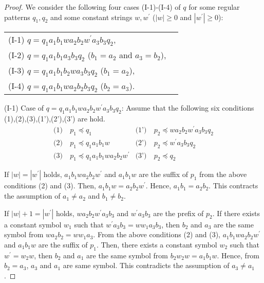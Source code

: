 \begin{proof}

\noindent
We consider the following four cases (I-1)-(I-4) of $q$ for some regular patterns $q_{1},q_{2}$ and some constant strings $w,w^{\prime}$ ($|w|\geq 0$ and $|w^{\prime}|\geq 0$):

\smallskip
\noindent
\begin{tabular}{ll}
(I-1) $q=q_{1}a_{1}b_{1}wa_{2}b_{2}w^{\prime}a_{3}b_{3}q_{2}$,\\
(I-2) $q=q_{1}a_{1}b_{1}a_{3}b_{3}q_{2}$ ($b_{1}=a_{2}$ and $a_{3}=b_{2}$),\\
(I-3) $q=q_{1}a_{1}b_{1}b_{2}wa_{3}b_{3}q_{2}$ ($b_{1}=a_{2}$),\\
(I-4) $q=q_{1}a_{1}b_{1}wa_{2}b_{2}b_{3}q_{2}$ ($b_{2}=a_{3}$).
\end{tabular}
\smallskip

\noindent
(I-1) Case of $q=q_{1}a_{1}b_{1}wa_{2}b_{2}w^{\prime}a_{3}b_{3}q_{2}$:
Assume that the following six conditions (1),(2),(3),(1'),(2'),(3') are hold.
\begin{align*}
\textrm{(1)}~& p_{1} \preceq q_{1} & \textrm{(1')}~& p_{2} \preceq wa_{2}b_{2}w^{\prime}a_{3}b_{3}q_{2} \\
\textrm{(2)}~& p_{1} \preceq q_{1}a_{1}b_{1}w & \textrm{(2')}~& p_{2} \preceq w^{\prime}a_{3}b_{3}q_{2} \\
\textrm{(3)}~& p_{1} \preceq q_{1}a_{1}b_{1}wa_{2}b_{2}w^{\prime} & \textrm{(3')}~& p_{2} \preceq q_{2}
\end{align*}

If $|w|=|w^{\prime}|$ holds, $a_{1}b_{1}wa_{2}b_{2}w^{\prime}$ and $a_{1}b_{1}w$ are the suffix of $p_{1}$ from the above conditions (2) and (3).
Then, $a_{1}b_{1}w=a_{2}b_{2}w^{\prime}$.
Hence, $a_{1}b_{1}=a_{2}b_{2}$.
This contracts the assumption of $a_{1} \ne a_{2}$ and $b_{1} \ne b_{2}$.

If $|w|+1=|w^{\prime}|$ holds, $wa_{2}b_{2}w^{\prime}a_{3}b_{3}$ and $w^{\prime}a_{3}b_{3}$ are the prefix of $p_{2}$.
If there exists a constant symbol $w_{1}$ such that $w^{\prime}a_{3}b_{3}=ww_{1}a_{3}b_{3}$,
then $b_{2}$ and $a_{3}$ are the same symbol from $wa_{2}b_{2}=ww_{1}a_{3}$.
From the above conditions (2) and (3), $a_{1}b_{1}wa_{2}b_{2}w^{\prime}$ and $a_{1}b_{1}w$ are the suffix of $p_{1}$.
Then, there exists a constant symbol $w_{2}$ such that $w^{\prime}=w_{2}w$,
then $b_{2}$ and $a_{1}$ are the same symbol from $b_{2}w_{2}w=a_{1}b_{1}w$.
Hence, from $b_{2}=a_{3}$, $a_{3}$ and $a_{1}$ are same symbol.
This contradicts the assumption of $a_{3} \ne a_{1}$.


\end{proof}
